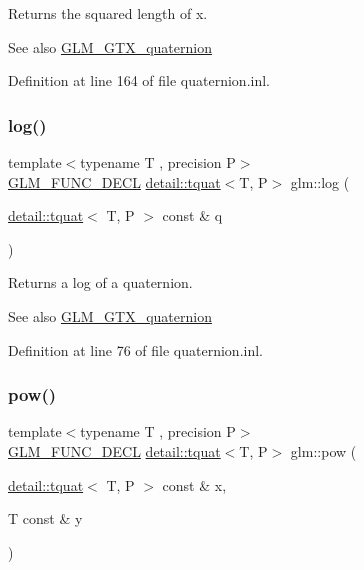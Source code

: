 Returns the squared length of x.

\begin{DoxySeeAlso}{See also}
\hyperlink{group__gtx__quaternion}{G\+L\+M\+\_\+\+G\+T\+X\+\_\+quaternion} 
\end{DoxySeeAlso}


Definition at line 164 of file quaternion.\+inl.

\mbox{\label{group__gtx__quaternion_ga832e6b69f9e5f596cad8bada9ebb4477}} 
\subsubsection{\texorpdfstring{log()}{log()}}
{\footnotesize\ttfamily template$<$typename T , precision P$>$ \\
\hyperlink{setup_8hpp_ab2d052de21a70539923e9bcbf6e83a51}{G\+L\+M\+\_\+\+F\+U\+N\+C\+\_\+\+D\+E\+CL} \hyperlink{structglm_1_1detail_1_1tquat}{detail\+::tquat}$<$T, P$>$ glm\+::log (\begin{DoxyParamCaption}\item[{\hyperlink{structglm_1_1detail_1_1tquat}{detail\+::tquat}$<$ T, P $>$ const \&}]{q }\end{DoxyParamCaption})}

Returns a log of a quaternion.

\begin{DoxySeeAlso}{See also}
\hyperlink{group__gtx__quaternion}{G\+L\+M\+\_\+\+G\+T\+X\+\_\+quaternion} 
\end{DoxySeeAlso}


Definition at line 76 of file quaternion.\+inl.

\mbox{\label{group__gtx__quaternion_ga9c9854d641f71f853cfed9dc5d4ef762}} 
\subsubsection{\texorpdfstring{pow()}{pow()}}
{\footnotesize\ttfamily template$<$typename T , precision P$>$ \\
\hyperlink{setup_8hpp_ab2d052de21a70539923e9bcbf6e83a51}{G\+L\+M\+\_\+\+F\+U\+N\+C\+\_\+\+D\+E\+CL} \hyperlink{structglm_1_1detail_1_1tquat}{detail\+::tquat}$<$T, P$>$ glm\+::pow (\begin{DoxyParamCaption}\item[{\hyperlink{structglm_1_1detail_1_1tquat}{detail\+::tquat}$<$ T, P $>$ const \&}]{x,  }\item[{T const \&}]{y }\end{DoxyParamCaption})}

